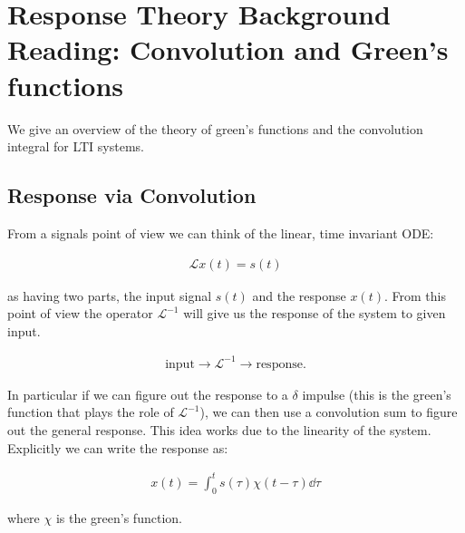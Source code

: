 
\section{Response Theory Background Reading: Convolution and Green's functions}

We give an overview of the theory of green's functions and the convolution integral for LTI systems.

\subsection{Response via Convolution}

From a signals point of view we can think of the linear, time invariant ODE:

\begin{align*}
\mathcal{L}x(t) = s(t) 
\end{align*}

as having two parts, the input signal $s(t)$ and the response $x(t)$. From this point of view the operator $\mathcal{L}^{-1}$ will give us the response of the system to given input.

\begin{align*}
\text{input} \to \mathcal{L}^{-1} \to \text{response}.
\end{align*}

In particular if we can figure out the response to a $\delta$ impulse (this is the green's function that plays the role of $\mathcal{L}^{-1}$), we can then use a convolution sum to figure out the general response. This idea works due to the linearity of the system. Explicitly we can write the response as:

\begin{align*}
x(t) = \int_{0}^{t} s(\tau) \chi (t - \tau) \dd \tau
\end{align*} 


where $\chi$ is the green's function.




